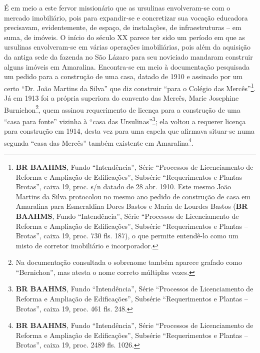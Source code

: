 É em meio a este fervor missionário que as ursulinas envolveram-se com o mercado imobiliário, pois para expandir-se e concretizar sua vocação educadora precisavam, evidentemente, de espaço, de instalações, de infraestruturas -- em suma, de imóveis. O início do século XX parece ter sido um período em que as ursulinas envolveram-se em várias operações imobiliárias, pois além da aquisição da antiga sede da fazenda no São Lázaro para seu noviciado mandaram construir alguns imóveis em Amaralina. Encontra-se em meio à documentação pesquisada um pedido para a construção de uma casa, datado de 1910 e assinado por um certo ``Dr. João Martins da Silva'' que diz construir ``para o Colégio das Mercês''\footnote{\textbf{BR BAAHMS}, Fundo ``Intendência'', Série ``Processos de Licenciamento de Reforma e Ampliação de Edificações'', Subsérie ``Requerimentos e Plantas -- Brotas'', caixa 19, proc. s/n datado de 28 abr. 1910. Este mesmo João Martins da Silva protocolou no mesmo ano pedido de construção de casa em Amaralina para Esmeraldina Dores Bastos e Maria de Lourdes Bastos (\textbf{BR BAAHMS}, Fundo ``Intendência'', Série ``Processos de Licenciamento de Reforma e Ampliação de Edificações'', Subsérie ``Requerimentos e Plantas -- Brotas'', caixa 19, proc. 730 fls. 187), o que permite entendê-lo como um misto de corretor imobiliário e incorporador.}. Já em 1913 foi a própria superiora do convento das Mercês, Marie Josephine Burnichon\footnote{Na documentação consultada o sobrenome também aparece grafado como ``Bernichon'', mas  atesta o nome correto múltiplas vezes.}, quem assinou requerimento de licença para a construção de uma ``casa para fonte'' vizinha à ``casa das Ursulinas''\footnote{\textbf{BR BAAHMS}, Fundo ``Intendência'', Série ``Processos de Licenciamento de Reforma e Ampliação de Edificações'', Subsérie ``Requerimentos e Plantas -- Brotas'', caixa 19, proc. 461 fls. 248.}; ela voltou a requerer licença para construção em 1914, desta vez para uma capela que afirmava situar-se numa segunda ``casa das Mercês'' também existente em Amaralina\footnote{\textbf{BR BAAHMS}, Fundo ``Intendência'', Série ``Processos de Licenciamento de Reforma e Ampliação de Edificações'', Subsérie ``Requerimentos e Plantas -- Brotas'', caixa 19, proc. 2489 fls. 1026.}. 

